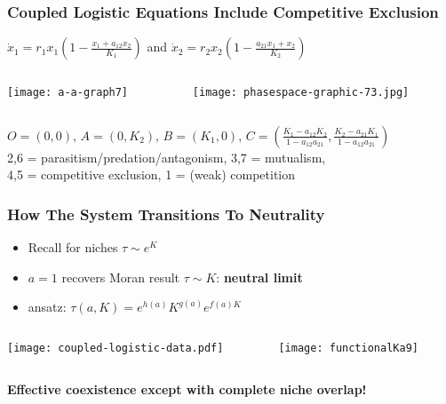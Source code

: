 \documentclass{beamer}
\begin{document}
\begin{frame}
\frametitle{Coupled Logistic Equations Include Competitive Exclusion}
\centering
$\dot{x}_1 = r_1 x_1 \left( 1 - \frac{x_1 + a_{12} x_2}{K_1} \right)$ and $\dot{x}_2 = r_2 x_2 \left( 1 - \frac{a_{21} x_1 + x_2}{K_2} \right)$
\begin{columns}
	\begin{column}{5cm}
		\begin{center}
			\texttt{[image: a-a-graph7]}
		\end{center}
	\end{column}
	\begin{column}{6cm}
		\begin{center}
			\texttt{[image: phasespace-graphic-73.jpg]}
		\end{center}
	\end{column}
\end{columns}
\footnotesize{
$O = (0,0)$, $A = (0,K_2)$, $B = (K_1,0)$, $C = (\frac{K_1-a_{12} K_2}{1-a_{12}a_{21}},\frac{K_2-a_{21} K_1}{1-a_{12}a_{21}})$ \\
2,6 = parasitism/predation/antagonism, 3,7 = mutualism, \\
4,5 = competitive exclusion, 1 = (weak) competition
}
\end{frame}


\begin{frame}
\frametitle{How The System Transitions To Neutrality}
\begin{itemize}
	\item Recall for niches $\tau \sim e^K$
	\item $a=1$ recovers Moran result $\tau \sim K$: \textbf{neutral limit}	%
	\pause
	\item ansatz: $\tau(a,K) = e^{h(a)}K^{g(a)}e^{f(a)K}$
\end{itemize}
\pause
\begin{columns}
	\begin{column}{5cm}
		\begin{center}
			\texttt{[image: coupled-logistic-data.pdf]}
		\end{center}
	\end{column}
\pause
	\begin{column}{6cm}
		\begin{center}
		\texttt{[image: functionalKa9]}
		\end{center}
	\end{column}
\end{columns}
\textbf{Effective coexistence except with complete niche overlap!}
\end{frame}
\end{document}
